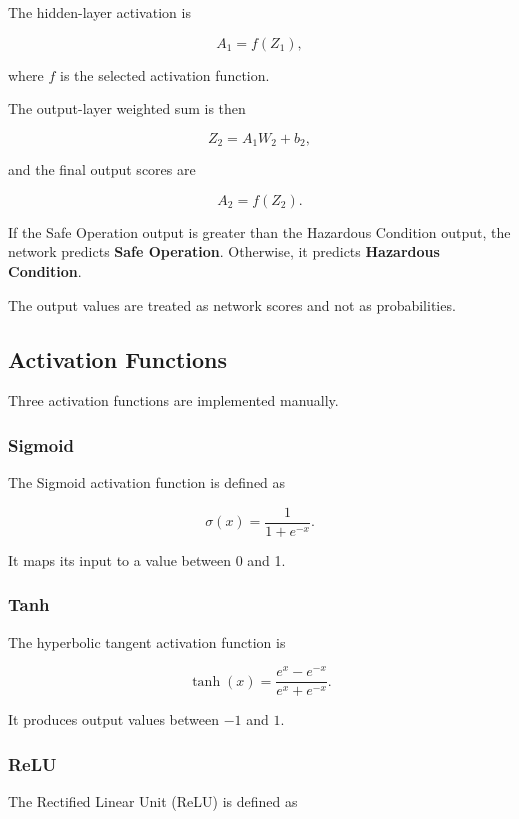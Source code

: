 \documentclass[12pt]{article}
\begin{document}
The hidden-layer activation is

\[
A_1 = f(Z_1),
\]

where $f$ is the selected activation function.

The output-layer weighted sum is then

\[
Z_2 = A_1W_2 + b_2,
\]

and the final output scores are

\[
A_2 = f(Z_2).
\]

If the Safe Operation output is greater than the Hazardous Condition
output, the network predicts \textbf{Safe Operation}. Otherwise, it
predicts \textbf{Hazardous Condition}.

The output values are treated as network scores and not as
probabilities.


\subsection{Activation Functions}

Three activation functions are implemented manually.

\subsubsection{Sigmoid}

The Sigmoid activation function is defined as

\[
\sigma(x) = \frac{1}{1 + e^{-x}}.
\]

It maps its input to a value between 0 and 1.

\subsubsection{Tanh}

The hyperbolic tangent activation function is

\[
\tanh(x) =
\frac{e^x-e^{-x}}
     {e^x+e^{-x}}.
\]

It produces output values between $-1$ and $1$.

\subsubsection{ReLU}

The Rectified Linear Unit (ReLU) is defined as
\end{document}
